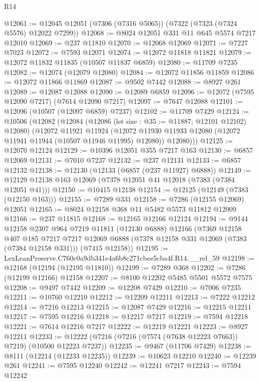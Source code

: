 \begin{lexlean}{R14}
\begin{coremodule}
@12061 := @12045 @12051 (@7306 (@7316 @5065)) (@7322 (@7323 (@7324 @5576) @12022 @7299))
@12068 := @8024 @12051 @331 @11 @645 @5574 @7217 @12010
@12069 := @237 @11810
@12070 := @12068 @12069
@12071 := @7227 @7023
@12072 := @7593 @12071
@12074 := @12072 @11818 @11821
@12079 := @12072 @11832 @11835 (@10507 @11837 @6859)
@12080 := @11709 @7235
@12082 := @12074 (@12079 @12080)
@12084 := @12072 @11856 @11859
@12086 := @12072 @11866 @11869
@12087 := @9502 @7442
@12088 := @8927 @261
@12089 := @12087 @12088
@12090 := @12089 @6859
@12096 := @12072 (@7595 @12090 @7217) (@7614 @12090 @7217)
@12097 := @7647 @12088
@12101 := @12096 (@10507 (@12097 @6859) @7237)
@12102 := @11709 @7429
@12124 := @10506
    (@12082
      (@12084
        (@12086 (let size : @35 := @11887; @12101 @12102) @12080)
        (@12072
          @11921
          @11924
          (@12072 @11930 @11933 @12080 (@12072 @11941 @11944 (@10507 @11946 @11995) @12080))
          @12080)))
@12125 := @12070 @12124
@12129 := @10396 @12051 @355 @7217 @163
@12130 := @6857 @12069
@12131 := @7010 @7237
@12132 := @237 @12131
@12133 := @6857 @12132
@12138 := @12130 (@12133 (@6857 (@237 @11927) @6888))
@12149 := @12129 @12138 @163 @12069 (@7378 @12051 @41 @12018 (@7383 (@7384 @12051 @41)))
@12150 := @10415 @12138
@12154 := @12125 (@12149 (@7383 (@12150 @163)))
@12155 := @7289 @331
@12158 := @7286 (@12155 @12069) @12051
@12165 := @8024 @12158 @368 @11 @5482 @5573 @11812 @12009
@12166 := @237 @11815
@12168 := @12165 @12166 @12124
@12194 := @9144
    @12158
    @2307
    @964
    @7219
    @11811
    (@12130 @6888)
    @12166
    (@7369
      @12158
      @407
      @185
      @7217
      @7217
      @12069
      @6888
      (@7378 @12158 @331 @12069 (@7383 (@7384 @12158 @331)))
      (@7415 @12158))
@12195 := LexLeanPreserve.C760c0a9db341e4a6b8c271cbee5cba4f.R14.__rel_59
@12198 := @12168 (@12194 (@12195 @11810))
@12199 := @7289 @368
@12202 := @7286 (@12199 @12166) @12158
@12207 := @8100 @12202 @5485 @5501 @5572 @7575
@12208 := @9497 @7442
@12209 := @12208 @7429
@12210 := @7006 @7235
@12211 := @10760 @12210
@12212 := @12209 @12211
@12213 := @7222 @12212
@12214 := @7216 @12213
@12215 := @12087 @7429
@12216 := @12215 @12211
@12217 := @7595 @12216
@12218 := @12217 @7217
@12219 := @7594 @12218
@12221 := @7614 @12216 @7217
@12222 := @12219 @12221
@12223 := @8927 @12211
@12233 := @12222 (@7216 (@7216 (@7574 (@7638 @12223 @7663)) @7219) (@10500 @12223 @7237))
@12235 := @9467 (@11706 @7429)
@12238 := @8111 (@12214 (@12233 @12235))
@12239 := @10623 @12210
@12240 := @12239 @261
@12241 := @7595 @12240
@12242 := @12241 @7217
@12243 := @7594 @12242

\end{coremodule}
\end{lexlean}
